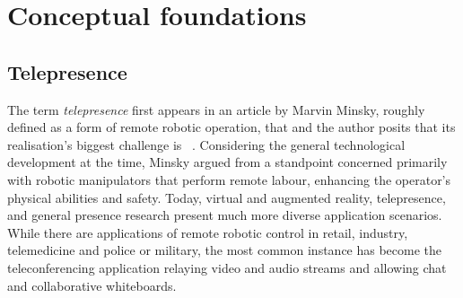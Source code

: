 \chapter{Conceptual foundations}
\label{ch:conceptualfoundations}

\section{Telepresence}
\label{sec:telepresence}

The term \emph{telepresence} first appears in an article by Marvin Minsky, roughly defined as a form of remote robotic operation, that  and the author posits that its realisation's biggest challenge is ~\parencite{minskyTelepresence}.
Considering the general technological development at the time, Minsky argued from a standpoint concerned primarily with robotic manipulators that perform remote labour, enhancing the operator's physical abilities and safety.
Today, virtual and augmented reality, telepresence, and general presence research present much more diverse application scenarios.
While there are applications of remote robotic control in retail, industry, telemedicine and police or military, the most common instance has become the teleconferencing application relaying video and audio streams and allowing chat and collaborative whiteboards.

